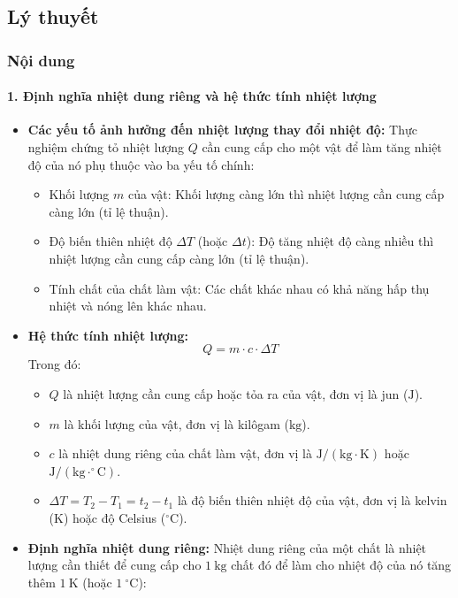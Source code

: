 \subsection{Lý thuyết}
\subsubsection{Nội dung}

\paragraph{1. Định nghĩa nhiệt dung riêng và hệ thức tính nhiệt lượng}
\begin{itemize}
    \item \textbf{Các yếu tố ảnh hưởng đến nhiệt lượng thay đổi nhiệt độ:} Thực nghiệm chứng tỏ nhiệt lượng $Q$ cần cung cấp cho một vật để làm tăng nhiệt độ của nó phụ thuộc vào ba yếu tố chính:
    \begin{itemize}
        \item Khối lượng $m$ của vật: Khối lượng càng lớn thì nhiệt lượng cần cung cấp càng lớn (tỉ lệ thuận).
        \item Độ biến thiên nhiệt độ $\Delta T$ (hoặc $\Delta t$): Độ tăng nhiệt độ càng nhiều thì nhiệt lượng cần cung cấp càng lớn (tỉ lệ thuận).
        \item Tính chất của chất làm vật: Các chất khác nhau có khả năng hấp thụ nhiệt và nóng lên khác nhau.
    \end{itemize}
    \item \textbf{Hệ thức tính nhiệt lượng:}
    \[
    Q = m \cdot c \cdot \Delta T
    \]
    Trong đó:
    \begin{itemize}
        \item $Q$ là nhiệt lượng cần cung cấp hoặc tỏa ra của vật, đơn vị là jun ($\mathrm{J}$).
        \item $m$ là khối lượng của vật, đơn vị là kilôgam ($\mathrm{kg}$).
        \item $c$ là nhiệt dung riêng của chất làm vật, đơn vị là $\mathrm{J/(kg\cdot K)}$ hoặc $\mathrm{J/(kg\cdot ^\circ C)}$.
        \item $\Delta T = T_2 - T_1 = t_2 - t_1$ là độ biến thiên nhiệt độ của vật, đơn vị là kelvin ($\mathrm{K}$) hoặc độ Celsius ($\mathrm{^\circ C}$).
    \end{itemize}
    \item \textbf{Định nghĩa nhiệt dung riêng:}
    Nhiệt dung riêng của một chất là nhiệt lượng cần thiết để cung cấp cho $1\ \mathrm{kg}$ chất đó để làm cho nhiệt độ của nó tăng thêm $1\ \mathrm{K}$ (hoặc $1\ \mathrm{^\circ C}$):

\end{itemize}
